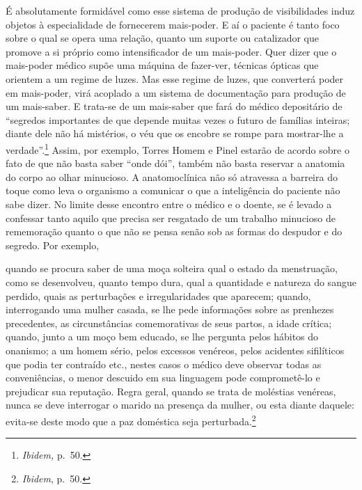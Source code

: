 É absolutamente formidável como esse sistema de produção de
visibilidades induz objetos à especialidade de fornecerem mais-poder. E
aí o paciente é tanto foco sobre o qual se opera uma relação, quanto um
suporte ou catalizador que promove a si próprio como intensificador de
um mais-poder. Quer dizer que o mais-poder médico supõe uma máquina de
fazer-ver, técnicas ópticas que orientem a um regime de luzes. Mas esse
regime de luzes, que converterá poder em mais-poder, virá acoplado a um
sistema de documentação para produção de um mais-saber. E trata-se de um
mais-saber que fará do médico depositário de ``segredos importantes de
que depende muitas vezes o futuro de famílias inteiras; diante dele não
há mistérios, o véu que os encobre se rompe para mostrar-lhe a
verdade''.\footnote{\emph{Ibidem,} p.~50.} Assim, por exemplo, Torres
Homem e Pinel estarão de acordo sobre o fato de que não basta saber
``onde dói'', também não basta reservar a anatomia do corpo ao olhar
minucioso. A anatomoclínica não só atravessa a barreira do toque como
leva o organismo a comunicar o que a inteligência do paciente não sabe
dizer. No limite desse encontro entre o médico e o doente, se é levado a
confessar tanto aquilo que precisa ser resgatado de um trabalho
minucioso de rememoração quanto o que não se pensa senão sob as formas
do despudor e do segredo. Por exemplo,

quando se procura saber de uma moça solteira qual o estado da
menstruação, como se desenvolveu, quanto tempo dura, qual a quantidade e
natureza do sangue perdido, quais as perturbações e irregularidades que
aparecem; quando, interrogando uma mulher casada, se lhe pede
informações sobre as prenhezes precedentes, as circunstâncias
comemorativas de seus partos, a idade crítica; quando, junto a um moço
bem educado, se lhe pergunta pelos hábitos do onanismo; a um homem
sério, pelos excessos venéreos, pelos acidentes sifilíticos que podia
ter contraído etc., nestes casos o médico deve observar todas as
conveniências, o menor descuido em sua linguagem pode comprometê-lo e
prejudicar sua reputação. Regra geral, quando se trata de moléstias
venéreas, nunca se deve interrogar o marido na presença da mulher, ou
esta diante daquele: evita-se deste modo que a paz doméstica seja
perturbada.\footnote{\emph{Ibidem}, p.~50.}

